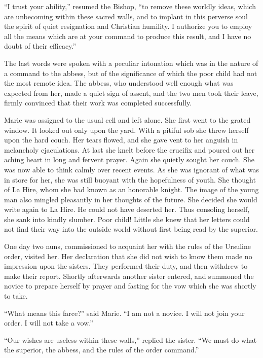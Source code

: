 ``I trust your ability,'' resumed the Bishop, ``to remove these worldly
ideas, which are unbecoming within these sacred walls, and to implant in
this perverse soul the spirit of quiet resignation and Christian
humility. I authorize you to employ all the means which are at your
command to produce this result, and I have no doubt of their efficacy.''

The last words were spoken with a peculiar intonation which was in the
nature of a command to the abbess, but of the significance of which the
poor child had not the most remote idea. The abbess, who understood well
enough what was expected from her, made a quiet sign of assent, and the
two men took their leave, firmly convinced that their work was completed
successfully.

Marie was assigned to the usual cell and left alone. She first went to
the grated window. It looked out only upon the yard. With a pitiful sob
she threw herself upon the hard couch. Her tears flowed, and she gave
vent to her anguish in melancholy ejaculations. At last she knelt before
the crucifix and poured out her aching heart in long and fervent prayer.
Again she quietly sought her couch. She was now able to think calmly
over recent events. As she was ignorant of what was in store for her,
she was still buoyant with the hopefulness of youth. She thought of La
Hire, whom she had known as an honorable knight. The image of the young
man also mingled pleasantly in her thoughts of the future. She decided
she would write again to La Hire. He could not have deserted her. Thus
consoling herself, she sank into kindly slumber. Poor child! Little she
knew that her letters could not find their way into the outside world
without first being read by the superior.

One day two nuns, commissioned to acquaint her with the rules of the
Ursuline order, visited her. Her declaration that she did not wish to
know them made no impression upon the sisters. They performed their
duty, and then withdrew to make their report. Shortly afterwards another
sister entered, and summoned the novice to prepare herself by prayer and
fasting for the vow which she was shortly to take.

``What means this farce?'' said Marie. ``I am not a novice. I will not
join your order. I will not take a vow.''

``Our wishes are useless within these walls,'' replied the sister. ``We
must do what the superior, the abbess, and the rules of the order
command.''

